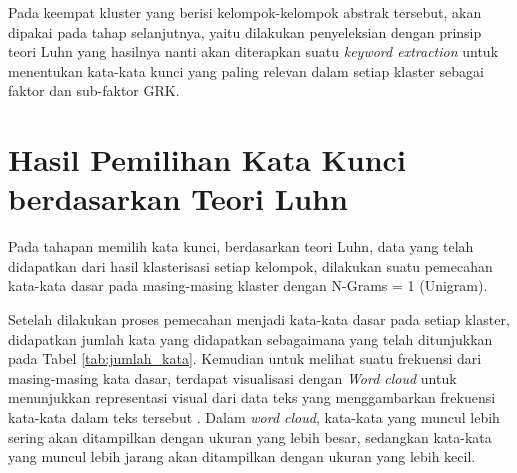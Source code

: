 Pada keempat kluster yang berisi kelompok-kelompok abstrak tersebut, akan dipakai pada tahap selanjutnya, yaitu dilakukan penyeleksian dengan prinsip teori Luhn yang hasilnya nanti akan diterapkan suatu \textit{keyword extraction} untuk menentukan kata-kata kunci yang paling relevan dalam setiap klaster sebagai faktor dan sub-faktor GRK. 

\section{Hasil Pemilihan Kata Kunci berdasarkan Teori Luhn}
Pada tahapan memilih kata kunci, berdasarkan teori Luhn, data yang telah didapatkan dari hasil klasterisasi setiap kelompok, dilakukan suatu pemecahan kata-kata dasar pada masing-masing klaster dengan N-Grams = 1 (Unigram). 

\begin{table}[H]
\centering
\caption{Total jumlah kata setiap klaster}
\label{tab:jumlah_kata}
\end{table}


Setelah dilakukan proses pemecahan menjadi kata-kata dasar pada setiap klaster, didapatkan jumlah kata yang didapatkan sebagaimana yang telah ditunjukkan pada Tabel \ref{tab:jumlah_kata}. Kemudian untuk melihat suatu frekuensi dari masing-masing kata dasar, terdapat visualisasi dengan \textit{Word cloud} untuk menunjukkan representasi visual dari data teks yang menggambarkan frekuensi kata-kata dalam teks tersebut \cite{hicke_word_2022}. Dalam \textit{word cloud}, kata-kata yang muncul lebih sering akan ditampilkan dengan ukuran yang lebih besar, sedangkan kata-kata yang muncul lebih jarang akan ditampilkan dengan ukuran yang lebih kecil. 

